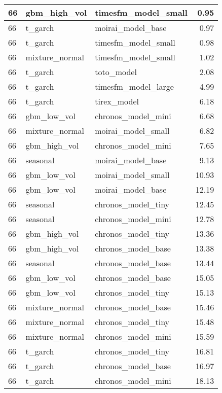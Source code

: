 {\begin{tabular}{lllr}
66 & gbm\_high\_vol & timesfm\_model\_small & 0.95 \\
\midrule
66 & t\_garch & moirai\_model\_base & 0.97 \\
\midrule
66 & t\_garch & timesfm\_model\_small & 0.98 \\
\midrule
66 & mixture\_normal & timesfm\_model\_small & 1.02 \\
\midrule
66 & t\_garch & toto\_model & 2.08 \\
\midrule
66 & t\_garch & timesfm\_model\_large & 4.99 \\
\midrule
66 & t\_garch & tirex\_model & 6.18 \\
\midrule
66 & gbm\_low\_vol & chronos\_model\_mini & 6.68 \\
\midrule
66 & mixture\_normal & moirai\_model\_small & 6.82 \\
\midrule
66 & gbm\_high\_vol & chronos\_model\_mini & 7.65 \\
\midrule
66 & seasonal & moirai\_model\_base & 9.13 \\
\midrule
66 & gbm\_low\_vol & moirai\_model\_small & 10.93 \\
\midrule
66 & gbm\_low\_vol & moirai\_model\_base & 12.19 \\
\midrule
66 & seasonal & chronos\_model\_tiny & 12.45 \\
\midrule
66 & seasonal & chronos\_model\_mini & 12.78 \\
\midrule
66 & gbm\_high\_vol & chronos\_model\_tiny & 13.36 \\
\midrule
66 & gbm\_high\_vol & chronos\_model\_base & 13.38 \\
\midrule
66 & seasonal & chronos\_model\_base & 13.44 \\
\midrule
66 & gbm\_low\_vol & chronos\_model\_base & 15.05 \\
\midrule
66 & gbm\_low\_vol & chronos\_model\_tiny & 15.13 \\
\midrule
66 & mixture\_normal & chronos\_model\_base & 15.46 \\
\midrule
66 & mixture\_normal & chronos\_model\_tiny & 15.48 \\
\midrule
66 & mixture\_normal & chronos\_model\_mini & 15.59 \\
\midrule
66 & t\_garch & chronos\_model\_tiny & 16.81 \\
\midrule
66 & t\_garch & chronos\_model\_base & 16.97 \\
\midrule
66 & t\_garch & chronos\_model\_mini & 18.13 \\
\bottomrule
\end{tabular}
}